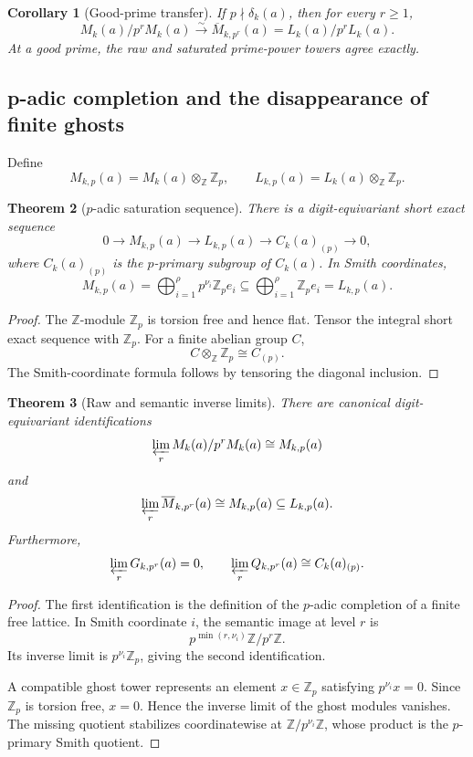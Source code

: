 \documentclass[11pt]{article}
\newtheorem{theorem}{Theorem}[section]
\newtheorem{corollary}[theorem]{Corollary}
\theoremstyle{definition}
\theoremstyle{remark}
\begin{document}
\begin{corollary}[Good-prime transfer]
\label{cor:block06-good-prime}
If \(p\nmid\delta_k(a)\), then for every \(r\geq1\),
\[
M_k(a)/p^rM_k(a)
\overset{\sim}{\longrightarrow}
\overline M_{k,p^r}(a)
=
L_k(a)/p^rL_k(a).
\]
At a good prime, the raw and saturated prime-power towers agree exactly.
\end{corollary}



\subsection{p-adic completion and the disappearance of finite ghosts}

Define
\[
M_{k,p}(a)=M_k(a)\otimes_{\mathbb Z}\mathbb Z_p,
\qquad
L_{k,p}(a)=L_k(a)\otimes_{\mathbb Z}\mathbb Z_p.
\]

\begin{theorem}[\(p\)-adic saturation sequence]
\label{thm:block06-padic-saturation}
There is a digit-equivariant short exact sequence
\[
0
\longrightarrow
M_{k,p}(a)
\longrightarrow
L_{k,p}(a)
\longrightarrow
C_k(a)_{(p)}
\longrightarrow
0,
\]
where \(C_k(a)_{(p)}\) is the \(p\)-primary subgroup of \(C_k(a)\).  In Smith coordinates,
\[
M_{k,p}(a)
=
\bigoplus_{i=1}^{\rho}p^{\nu_i}\mathbb Z_p e_i
\subseteq
\bigoplus_{i=1}^{\rho}\mathbb Z_p e_i
=
L_{k,p}(a).
\]
\end{theorem}

\begin{proof}
The \(\mathbb Z\)-module \(\mathbb Z_p\) is torsion free and hence flat.  Tensor the integral short exact sequence with \(\mathbb Z_p\).  For a finite abelian group \(C\),
\[
C\otimes_{\mathbb Z}\mathbb Z_p\cong C_{(p)}.
\]
The Smith-coordinate formula follows by tensoring the diagonal inclusion.
\end{proof}

\begin{theorem}[Raw and semantic inverse limits]
\label{thm:block06-inverse-limits}
There are canonical digit-equivariant identifications
\[
\varprojlim_r M_k(a)/p^rM_k(a)
\cong
M_{k,p}(a)
\]
and
\[
\varprojlim_r \overline M_{k,p^r}(a)
\cong
M_{k,p}(a)
\subseteq
L_{k,p}(a).
\]
Furthermore,
\[
\varprojlim_r G_{k,p^r}(a)=0,
\qquad
\varprojlim_r Q_{k,p^r}(a)
\cong
C_k(a)_{(p)}.
\]
\end{theorem}

\begin{proof}
The first identification is the definition of the \(p\)-adic completion of a finite free lattice.  In Smith coordinate \(i\), the semantic image at level \(r\) is
\[
p^{\min(r,\nu_i)}\mathbb Z/p^r\mathbb Z.
\]
Its inverse limit is \(p^{\nu_i}\mathbb Z_p\), giving the second identification.

A compatible ghost tower represents an element \(x\in\mathbb Z_p\) satisfying \(p^{\nu_i}x=0\).  Since \(\mathbb Z_p\) is torsion free, \(x=0\).  Hence the inverse limit of the ghost modules vanishes.  The missing quotient stabilizes coordinatewise at \(\mathbb Z/p^{\nu_i}\mathbb Z\), whose product is the \(p\)-primary Smith quotient.
\end{proof}
\end{document}
